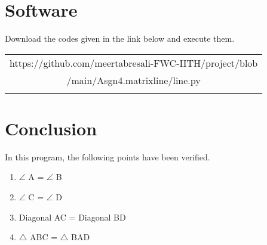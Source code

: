 \documentclass[journal,10pt,twocolumn]{article}
\begin{document}

\section{Software}
\centering
Download the codes given in the link below and execute them.\\
\begin{table}[H]
\centering
\begin{tabular}{|c|} \hline
\rule{0pt}{10pt} 
https://github.com/meertabresali-FWC-IITH/project/blob \\
/main/Asgn4.matrixline/line.py\\
\\\hline
 \end{tabular}
\end{table}
\section{Conclusion}
\begin{flushleft}
In this program, the following points have been verified.\\
\vspace{0.1cm}
\begin{enumerate}
    \item $\angle$ A = $\angle$ B\\
    \item $\angle$ C = $\angle$ D\\
    \item Diagonal AC = Diagonal BD\\
    \item $\triangle$ ABC  = $\triangle$ BAD \\
\end{enumerate}
\end{flushleft}
\end{document}
